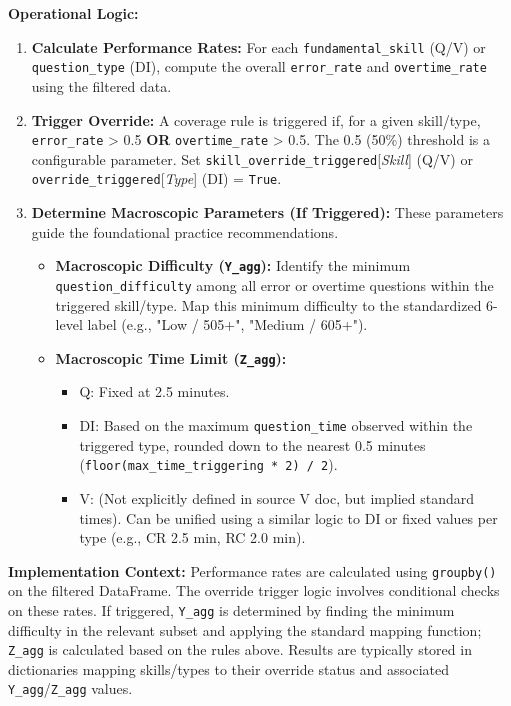 \documentclass{article}
\begin{document}
\textbf{Operational Logic:}
\begin{enumerate}
    \item \textbf{Calculate Performance Rates:} For each \texttt{fundamental\_skill} (Q/V) or \texttt{question\_type} (DI), compute the overall \texttt{error\_rate} and \texttt{overtime\_rate} using the filtered data.
    \item \textbf{Trigger Override:} A coverage rule is triggered if, for a given skill/type, \texttt{error\_rate} > 0.5 \textbf{OR} \texttt{overtime\_rate} > 0.5. The 0.5 (50\%) threshold is a configurable parameter. Set \texttt{skill\_override\_triggered}[\textit{Skill}] (Q/V) or \texttt{override\_triggered}[\textit{Type}] (DI) = \texttt{True}.
    \item \textbf{Determine Macroscopic Parameters (If Triggered):} These parameters guide the foundational practice recommendations.
    \begin{itemize}
        \item \textbf{Macroscopic Difficulty (\texttt{Y\_agg}):} Identify the minimum \texttt{question\_difficulty} among all error or overtime questions within the triggered skill/type. Map this minimum difficulty to the standardized 6-level label (e.g., "Low / 505+", "Medium / 605+").
        \item \textbf{Macroscopic Time Limit (\texttt{Z\_agg}):}
        \begin{itemize}
            \item Q: Fixed at 2.5 minutes.
            \item DI: Based on the maximum \texttt{question\_time} observed within the triggered type, rounded down to the nearest 0.5 minutes (\texttt{floor(max\_time\_triggering * 2) / 2}).
            \item V: (Not explicitly defined in source V doc, but implied standard times). Can be unified using a similar logic to DI or fixed values per type (e.g., CR 2.5 min, RC 2.0 min).
        \end{itemize}
    \end{itemize}
\end{enumerate}

\textbf{Implementation Context:} Performance rates are calculated using \texttt{groupby()} on the filtered DataFrame. The override trigger logic involves conditional checks on these rates. If triggered, \texttt{Y\_agg} is determined by finding the minimum difficulty in the relevant subset and applying the standard mapping function; \texttt{Z\_agg} is calculated based on the rules above. Results are typically stored in dictionaries mapping skills/types to their override status and associated \texttt{Y\_agg}/\texttt{Z\_agg} values.
\end{document}
